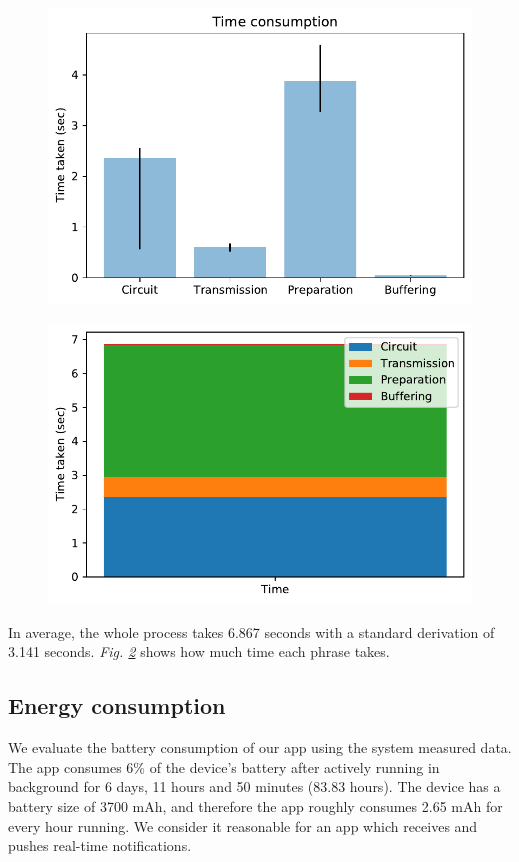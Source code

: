 \begin{figure}
	\includegraphics[width=\linewidth]{plot1.pdf}
	\caption{}
	\label{fig:timeconsumption}
\end{figure}

\begin{figure}
	\includegraphics[width=\linewidth]{plot2.pdf}
	\caption{}
	\label{fig:timepercentage}
\end{figure}

In average, the whole process takes 6.867 seconds with a standard derivation of 3.141 seconds. \textit{Fig. \ref{fig:timepercentage}} shows how much time each phrase takes.


\subsection{Energy consumption}
We evaluate the battery consumption of our app using the system measured data. The app consumes 6\% of the device's battery after actively running in background for 6 days, 11 hours and 50 minutes (83.83 hours). The device has a battery size of 3700 mAh, and therefore the app roughly consumes 2.65 mAh for every hour running. We consider it reasonable for an app which receives and pushes real-time notifications.

